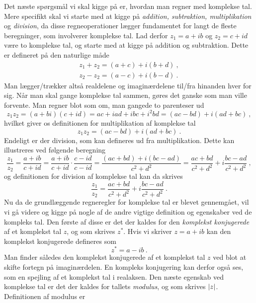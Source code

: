 \noindent
Det næste spørgsmål vi skal kigge på er, hvordan man regner med komplekse tal. Mere specifikt skal vi starte med at kigge på \emph{addition, subtraktion, multiplikation} og \emph{division}, da disse regneoperationer lægger fundamentet for langt de fleste beregninger, som involverer komplekse tal. Lad derfor $z_1 = a+ib$ og $z_2 = c+id$ være to komplekse tal, og starte med at kigge på addition og subtraktion. Dette er defineret på den naturlige måde
\begin{align}
\label{kompleks_add}
z_1+z_2 = (a+c) + i(b+d) \ , \\
\label{kompleks_sub}
z_2-z_2 = (a-c) + i(b-d) \ .
\end{align}
Man lægger/trækker altså realdelene og imaginærdelene til/fra hinanden hver for sig. Når man skal gange komplekse tal sammen, gøres det ganske som man ville forvente. Man regner blot som om, man gangede to parenteser ud
$$z_1 z_2 = (a+bi)(c+id) = ac + iad + ibc + i^2bd = (ac-bd) + i(ad+bc) \ ,$$
hvilket giver os definitionen for multiplikation af komplekse tal
\begin{equation}
\label{kompleks_mul}
z_1z_2 = (ac-bd) +i(ad+bc) \ .
\end{equation}
Endeligt er der division, som kan defineres ud fra multiplikation. Dette kan illustreres ved følgende beregning
$$\frac{z_1}{z_2} = \frac{a+ib}{c+id} = \frac{a+ib}{c+id} \cdot \frac{c-id}{c-id} = \frac{(ac+bd) + i(bc-ad)}{c^2 + d^2} = \frac{ac+bd}{c^2 + d^2} + i \frac{bc-ad}{c^2 + d^2} \ ,$$
og definitionen for division af komplekse tal kan da skrives
\begin{equation}
\label{kompleks_div}
\frac{z_1}{z_2} = \frac{ac+bd}{c^2+d^2} + i\frac{bc-ad}{c^2+d^2} \ .
\end{equation}
Nu da de grundlæggende regneregler for komplekse tal er blevet gennemgået, vil vi gå videre og kigge på nogle af de andre vigtige definition og egenskaber ved de kompleks tal. Den første af disse er det der kaldes for den \emph{komplekst konjugerede} af et komplekst tal $z$, og som skrives $z^*$. Hvis vi skriver $z = a+ib$ kan den komplekst konjugerede defineres som
\begin{equation}
z^* = a - ib \ .
\end{equation}
Man finder således den komplekst konjugerede af et komplekst tal $z$ ved blot at skifte fortegn på imaginærdelen. En kompleks konjugering kan derfor også ses, som en spejling af et komplekst tal i realaksen. Den næste egenskab ved komplekse tal er det der kaldes for tallets \emph{modulus}, og som skrives $\left| z \right|$. Definitionen af modulus er
